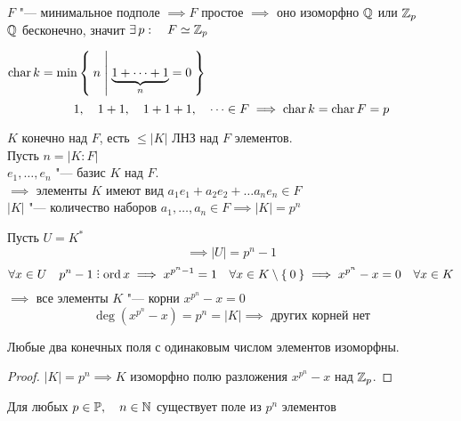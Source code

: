 \begin{eproof}
	\item $ F $ "--- минимальное подполе $ \implies F $ простое $ \implies $ оно изоморфно $ \mathbb{Q} $ или $ \mathbb{Z}_p $ \\
	$ \mathbb{Q} $ бесконечно, значит $ \exists\, p : \quad F \simeq \mathbb{Z}_p $
	\item $ \operatorname{char} k = \min\Set{n | \underbrace{1 + \dots + 1}_n = 0} $
	$$ 1, \quad 1 + 1, \quad 1 + 1 + 1, \quad \dots \in F \implies \operatorname{char} k = \operatorname{char} F = p $$
	\item $ K $ конечно над $ F $, \as есть $ \le |K| $ ЛНЗ над $ F $ элементов. \\
	Пусть $ n = |K : F| $ \\
	$ e_1, \dots, e_n $ "--- базис $ K $ над $ F $. \\
	$ \implies $ элементы $ K $ имеют вид $ a_1e_1 + a_2e_2 + \dots a_ne_n \in F $ \\
	$ |K| $ "--- количество наборов $ a_1, \dots, a_n \in F \implies |K| = p^n $
	\item Пусть $ U = K^* $ 
	$$ \implies |U| = p^n - 1 $$
	$$ \forall x \in U \quad p^n - 1 \divby \ord x \implies x^{p^n - 1} = 1 \quad \forall x \in K \setminus \set{0} \implies x^{p^n} - x = 0 \quad \forall x \in K $$
	$ \implies $ все элементы $ K $ "--- корни $ x^{p^n} - x = 0 $
	$$ \deg(x^{p^n} - x) = p^n = |K| \implies \text{ других корней нет} $$
\end{eproof}

\begin{implication}[единственность]
	Любые два конечных поля с одинаковым числом элементов изоморфны.
\end{implication}

\begin{proof}
	$ |K| = p^n \implies K $ изоморфно полю разложения $ x^{p^n} - x $ над $ \mathbb{Z}_p $.
\end{proof}

\begin{theorem}[сущетсвование]
	Для любых $ p \in \mathbb{P}, \quad n \in \mathbb{N} $ существует поле из $ p^n $ элементов
\end{theorem}

